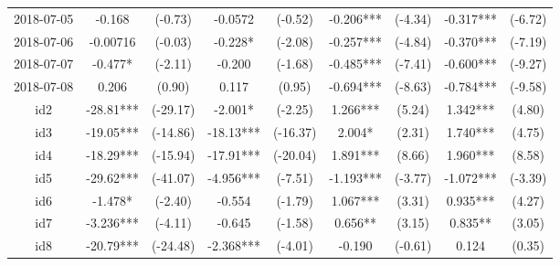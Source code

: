 \documentclass[entropy,article,submit,moreauthors,LaTeX and dvi2pdf]{Definitions/mdpi}
\begin{document}
\begin{center}
\begin{longtable}{ccccccccc}
2018-07-05                                    & -0.168        & (-0.73)       & -0.0572         & (-0.52)          & -0.206***         & (-4.34)           & -0.317***         & (-6.72)           \\
2018-07-06                                    & -0.00716      & (-0.03)       & -0.228*         & (-2.08)          & -0.257***         & (-4.84)           & -0.370***         & (-7.19)           \\
2018-07-07                                    & -0.477*       & (-2.11)       & -0.200          & (-1.68)          & -0.485***         & (-7.41)           & -0.600***         & (-9.27)           \\
2018-07-08                                    & 0.206         & (0.90)        & 0.117           & (0.95)           & -0.694***         & (-8.63)           & -0.784***         & (-9.58)           \\
id2                                           & -28.81***     & (-29.17)      & -2.001*         & (-2.25)          & 1.266***          & (5.24)            & 1.342***          & (4.80)            \\
id3                                           & -19.05***     & (-14.86)      & -18.13***       & (-16.37)         & 2.004*            & (2.31)            & 1.740***          & (4.75)            \\
id4                                           & -18.29***     & (-15.94)      & -17.91***       & (-20.04)         & 1.891***          & (8.66)            & 1.960***          & (8.58)            \\
id5                                           & -29.62***     & (-41.07)      & -4.956***       & (-7.51)          & -1.193***         & (-3.77)           & -1.072***         & (-3.39)           \\
id6                                           & -1.478*       & (-2.40)       & -0.554          & (-1.79)          & 1.067***          & (3.31)            & 0.935***          & (4.27)            \\
id7                                           & -3.236***     & (-4.11)       & -0.645          & (-1.58)          & 0.656**           & (3.15)            & 0.835**           & (3.05)            \\
id8                                           & -20.79***     & (-24.48)      & -2.368***       & (-4.01)          & -0.190            & (-0.61)           & 0.124             & (0.35)            \\

\end{longtable}
\end{center}
\end{document}
